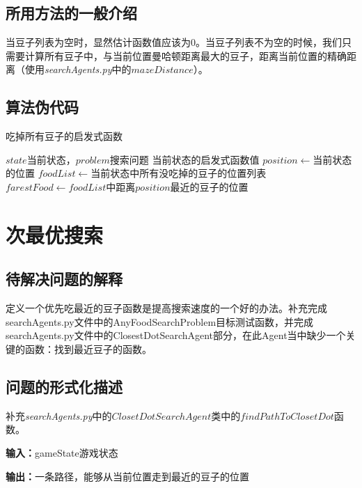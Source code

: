 \documentclass[forprint]{WHUBachelor}
\begin{document}
\subsection{所用方法的一般介绍}

当豆子列表为空时，显然估计函数值应该为0。当豆子列表不为空的时候，我们只需要计算所有豆子中，与当前位置曼哈顿距离最大的豆子，距离当前位置的精确距离（使用\emph{searchAgents.py}中的$mazeDistance$）。

\subsection{算法伪代码}

\begin{algorithm}[H]
  \caption{吃掉所有豆子的启发式函数}
  \begin{algorithmic}[1] %
    \Require $state$当前状态，$problem$搜索问题
    \Ensure 当前状态的启发式函数值
    \State $position \gets $当前状态的位置
    \State $foodList \gets $当前状态中所有没吃掉的豆子的位置列表
    \State {}
    \Else
    \State $farestFood \gets foodList$中距离$position$最近的豆子的位置
    \State {}
    \EndIf
  \end{algorithmic}
\end{algorithm}

\section{次最优搜索}

\subsection{待解决问题的解释}

定义一个优先吃最近的豆子函数是提高搜索速度的一个好的办法。补充完成searchAgents.py文件中的AnyFoodSearchProblem目标测试函数，并完成searchAgents.py文件中的ClosestDotSearchAgent部分，在此Agent当中缺少一个关键的函数：找到最近豆子的函数。

\subsection{问题的形式化描述}

补充\emph{searchAgents.py}中的$ClosetDotSearchAgent$类中的$findPathToClosetDot$函数。

\textbf{输入：}gameState游戏状态

\textbf{输出：}一条路径，能够从当前位置走到最近的豆子的位置
\end{document}
